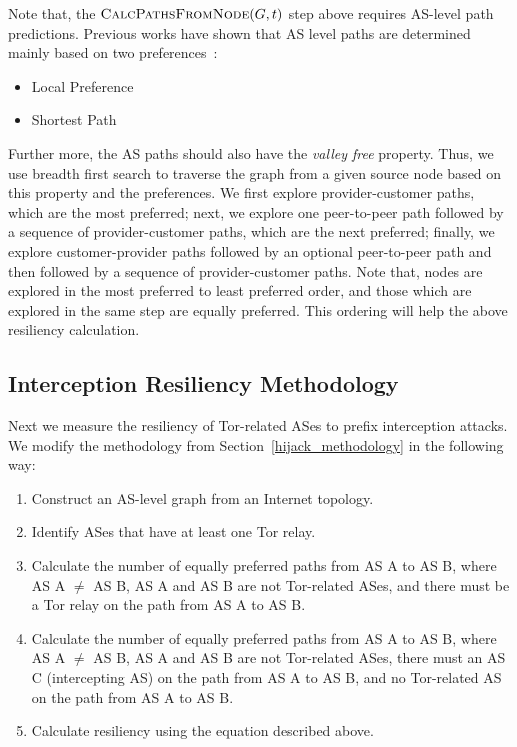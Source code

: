 Note that, the $\Call{CalcPathsFromNode}{G,t}$ step above requires AS-level path predictions. Previous works have shown that AS level paths are determined mainly based on two preferences~\cite{starov2015measuring}:

\begin{itemize}
\item Local Preference
\item Shortest Path
\end{itemize}

Further more, the AS paths should also have the \emph{valley free} property. Thus, we use breadth first search to traverse the graph from a given source node based on this property and the preferences. We first explore provider-customer paths, which are the most preferred; next, we explore one peer-to-peer path followed by a sequence of provider-customer paths, which are the next preferred; finally, we explore customer-provider paths followed by an optional peer-to-peer path and then followed by a sequence of provider-customer paths. Note that, nodes are explored in the most preferred to least preferred order, and those which are explored in the same step are equally preferred. This ordering will help the above resiliency calculation. 



\subsection{Interception Resiliency Methodology}
Next we measure the resiliency of Tor-related ASes to prefix interception attacks.  We modify the methodology from Section~\ref{hijack_methodology} in the following way:

\begin{enumerate}
\item Construct an AS-level graph from an Internet topology.
\item Identify ASes that have at least one Tor relay.
\item Calculate the number of equally preferred paths from AS A to AS B, where AS A $\neq$ AS B, AS A and AS B are not Tor-related ASes, and there must be a Tor relay on the path from AS A to AS B.
\item Calculate the number of equally preferred paths from AS A to AS B, where AS A $\neq$ AS B, AS A and AS B are not Tor-related ASes, there must an AS C (intercepting AS) on the path from AS A to AS B, and no Tor-related AS on the path from AS A to AS B.
\item Calculate resiliency using the equation described above.
\end{enumerate}


